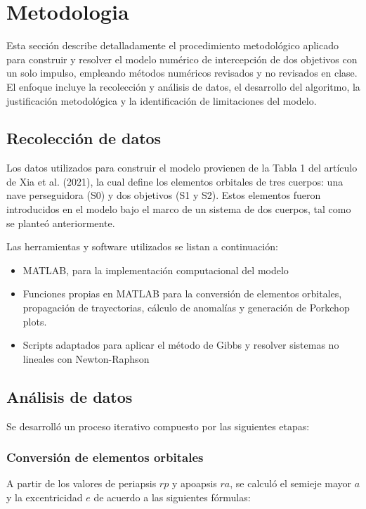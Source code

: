 \section{Metodologia}
Esta sección describe detalladamente el procedimiento metodológico aplicado
para construir y resolver el modelo numérico de intercepción de dos objetivos
con un solo impulso, empleando métodos numéricos revisados y no revisados en
clase. El enfoque incluye la recolección y análisis de datos, el desarrollo del
algoritmo, la justificación metodológica y la identificación de limitaciones
del modelo.

\subsection{Recolección de datos}
Los datos utilizados para construir el modelo provienen de la Tabla 1 del
artículo de Xia et al. (2021), la cual define los elementos orbitales de tres
cuerpos: una nave perseguidora (S0) y dos objetivos (S1 y S2). Estos elementos
fueron introducidos en el modelo bajo el marco de un sistema de dos cuerpos,
tal como se planteó anteriormente.

Las herramientas y software utilizados se listan a continuación:

\begin{itemize}
    \item MATLAB, para la implementación computacional del modelo
    \item Funciones propias en MATLAB para la conversión de elementos orbitales,
          propagación de trayectorias, cálculo de anomalías y generación de Porkchop
          plots.
    \item Scripts adaptados para aplicar el método de Gibbs y resolver sistemas no
          lineales con Newton-Raphson
\end{itemize}

\subsection{Análisis de datos}
Se desarrolló un proceso iterativo compuesto por las siguientes etapas:

\subsubsection{Conversión de elementos orbitales}
A partir de los valores de periapsis $rp$ y apoapsis $ra$, se calculó el
semieje mayor $a$ y la excentricidad $e$ de acuerdo a las siguientes fórmulas:


